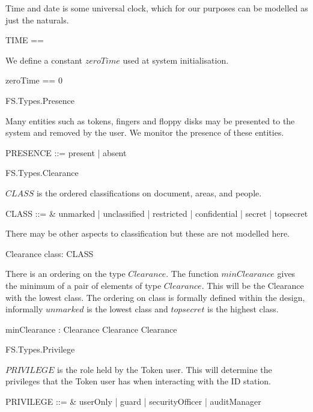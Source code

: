 Time and date is some universal clock,
which for our purposes can be modelled as just the naturals.
\begin{zed}
	TIME == \nat
\end{zed}

We define a constant $zeroTime$ used at system initialisation.

\begin{zed}
        zeroTime == 0
\end{zed}

\begin{traceunit}{FS.Types.Presence}
\end{traceunit}

Many entities such as tokens, fingers and floppy disks may be
presented to the system and removed by the user. We monitor the
presence of these entities.
\begin{zed}
	PRESENCE ::= present | absent
\end{zed}

\begin{traceunit}{FS.Types.Clearance}
\end{traceunit}


$CLASS$ is the ordered classifications on document, areas, and people.
\begin{syntax}
	CLASS ::= & unmarked | unclassified | restricted | confidential |
		secret | topsecret
\end{syntax}

There may be other aspects to classification but these are not
modelled here.

\begin{schema}{Clearance}
	class: CLASS
\end{schema}

There is an ordering on the type $Clearance$. The function
$minClearance$  gives the minimum of a
pair of elements of type $Clearance$. This will be the Clearance with
the lowest class. The ordering on class is formally defined within the
design, informally $unmarked$ is the lowest class and $topsecret$ is
the highest class. 

\begin{axdef}
        minClearance : Clearance \cross Clearance \fun Clearance
\end{axdef}

\begin{traceunit}{FS.Types.Privilege}
\end{traceunit}


$PRIVILEGE$ is the role held by the Token user. This will determine
the privileges that the Token user has when interacting with the ID
station.
\begin{syntax}
        PRIVILEGE ::= & userOnly | guard | securityOfficer | auditManager 
\end{syntax}


